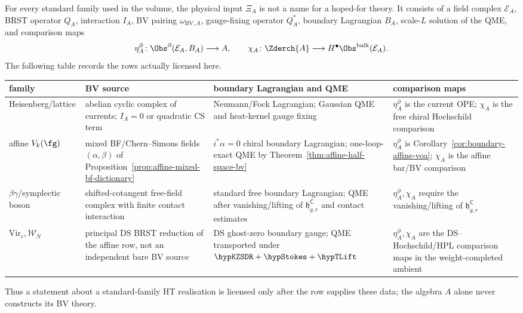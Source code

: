 \begin{proposition}
\label{prop:standard-family-bv-realisation-data}
For every standard family used in the volume, the physical input
\(\Xi_A\) is not a name for a hoped-for theory.  It consists of a
field complex \(\mathcal E_A\), BRST operator \(Q_A\), interaction
\(I_A\), BV pairing \(\omega_{\mathrm{BV},A}\), gauge-fixing
operator \(Q_A^*\), boundary Lagrangian \(B_A\), scale-\(L\) solution
of the QME, and comparison maps
\[
 \eta_A^\partial\colon \Obs^\partial(\mathcal E_A,B_A)\longrightarrow A,
 \qquad
 \chi_A\colon \Zderch{A}\longrightarrow
 H^\bullet\Obs^{\mathrm{bulk}}(\mathcal E_A).
\]
The following table records the rows actually licensed here.
\begin{center}
\small
\begin{tabular}{p{}p{}p{}p{}}
family & BV source & boundary Lagrangian and QME &
comparison maps \\
\hline
Heisenberg/lattice &
abelian cyclic complex of currents; \(I_A=0\) or quadratic CS term &
Neumann/Fock Lagrangian; Gaussian QME and heat-kernel gauge fixing &
\(\eta^\partial_A\) is the current OPE; \(\chi_A\) is the free chiral Hochschild comparison \\
affine \(V_k(\fg)\) &
mixed BF/Chern--Simons fields \((\alpha,\beta)\) of Proposition~\ref{prop:affine-mixed-bf-dictionary} &
\(i^*\alpha=0\) chiral boundary Lagrangian; one-loop-exact QME by Theorem~\ref{thm:affine-half-space-bv} &
\(\eta^\partial_A\) is Corollary~\ref{cor:boundary-affine-voa}; \(\chi_A\) is the affine bar/BV comparison \\
\(\beta\gamma\)/symplectic boson &
shifted-cotangent free-field complex with finite contact interaction &
standard free boundary Lagrangian; QME after vanishing/lifting of \(\mathfrak h_{g,r}^{\mathsf C}\) and contact estimates &
\(\eta^\partial_A,\chi_A\) require the vanishing/lifting of \(\mathfrak h_{g,r}^{\mathsf C}\) \\
\(\mathrm{Vir}_c,\mathcal W_N\) &
principal DS BRST reduction of the affine row, not an independent bare BV source &
DS ghost-zero boundary gauge; QME transported under \(\hypKZSDR+\hypStokes+\hypTLift\) &
\(\eta^\partial_A,\chi_A\) are the DS--Hochschild/HPL comparison maps in the weight-completed ambient
\end{tabular}
\end{center}
Thus a statement about a standard-family HT realisation is licensed
only after the row supplies these data; the algebra \(A\) alone never
constructs its BV theory.
\end{proposition}

